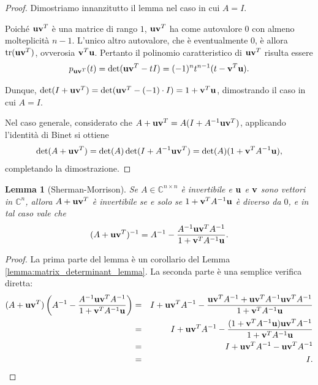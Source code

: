 \documentclass[a4paper]{article}
\newcommand{\CC}{\mathbb{C}}
\newcommand{\vvec}{{\bf v}}
\newcommand{\uvec}{{\bf u}}
\DeclareMathOperator{\tr}{tr}
\newtheorem{lemma}{Lemma}
\begin{document}
\begin{proof}
    Dimostriamo innanzitutto il lemma nel caso in cui $A = I$.
    
    Poiché
    $\uvec \vvec^T$ è una matrice di rango $1$, $\uvec \vvec^T$ ha come autovalore $0$ con
    almeno molteplicità $n-1$. L'unico altro autovalore, che è eventualmente $0$,
    è allora $\tr(\uvec \vvec^T)$, ovverosia $\vvec^T \uvec$. Pertanto il polinomio caratteristico
    di $\uvec \vvec^T$ risulta essere
    \[p_{\uvec \vvec^T}(t) = \det(\uvec \vvec^T - tI) = (-1)^{n} t^{n-1}(t-\vvec^T \uvec).\]

    Dunque, $\det(I+\uvec \vvec^T) = \det(\uvec \vvec^T - (-1)\cdot I) = 1+\vvec^T \uvec$,
    dimostrando il caso in cui $A = I$. 
    
    Nel caso generale, considerato che $A + \uvec \vvec^T = A(I+A^{-1}\uvec \vvec^T)$, applicando l'identità di Binet si ottiene
    \[
        \det(A + \uvec \vvec^T) =
        \det(A) \det(I + A^{-1} \uvec \vvec^T) = \det(A) (1+\vvec^T A^{-1} \uvec),
    \]
    completando la dimostrazione.
\end{proof}

\begin{lemma}[Sherman-Morrison]
    \label{lemma:sherman}
    Se $A \in \CC^{n \times n}$ è invertibile e $\uvec$ e $\vvec$ sono vettori in $\CC^n$, allora $A + \uvec \vvec^T$ è invertibile se e solo se $1 + \vvec^T A^{-1} \uvec$ è diverso da $0$, e in tal caso vale che
    \[
        (A+\uvec \vvec^T)^{-1} = A^{-1} - \frac{A^{-1} \uvec \vvec^T A^{-1}}{1 + \vvec^T A^{-1} \uvec}.
    \]
\end{lemma}

\begin{proof}
    La prima parte del lemma è un corollario del Lemma \ref{lemma:matrix_determinant_lemma}.
    La seconda parte è una semplice verifica diretta:
    \begin{eqnarray}
        (A+\uvec \vvec^T)\left(A^{-1} - \frac{A^{-1} \uvec \vvec^T A^{-1}}{1 + \vvec^T A^{-1} \uvec}\right)
        &=&
        I+\uvec \vvec^TA^{-1} - \frac{\uvec \vvec^TA^{-1} + \uvec \vvec^T A^{-1} \uvec \vvec^T A^{-1}}{1 + \vvec^T A^{-1} \uvec} \nonumber \\
        &=& I+\uvec \vvec^TA^{-1} - \frac{(1+\vvec^T A^{-1} \uvec)\uvec \vvec^TA^{-1}}{1+\vvec^T A^{-1} \uvec} \nonumber \\
        &=& I + \uvec \vvec^T A^{-1} - \uvec \vvec^TA^{-1} \nonumber \\
        &=& I. \nonumber
    \end{eqnarray}
\end{proof}
\end{document}
